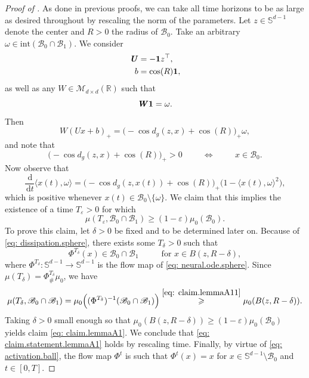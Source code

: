 \documentclass[a4paper,11pt]{article}
\theoremstyle{plain}
\newcommand{\diff}{\, \mathrm{d}}
\renewcommand{\S}{\mathbb{S}^{d-1}}
\newcommand{\bW}{\bm{\mathit{W}}}
\newcommand{\bU}{\bm{\mathit{U}}}
\renewcommand{\geq}{\geqslant}
\numberwithin{equation}{section}
\begin{document}
\begin{proof}[Proof of ]
As done in previous proofs, we can take all time horizons to be as large as desired throughout by rescaling the norm of the parameters.
Let $z\in\S$ denote the center and $R>0$ the radius of $\mathscr{B}_0$. Take an arbitrary $\omega\in\mathrm{int}(\mathscr{B}_0\cap\mathscr{B}_1)$. We consider
\begin{align*}
\bU&=-{\bf1} z^\top,\\
b&=\cos(R){\bf1},
\end{align*}
as well as any $\bW\in \mathscr{M}_{d\times d}(\mathbb{R})$ such that
\begin{equation*}
\bW{\bf1}=\omega.
\end{equation*}
Then
\begin{equation*}
    \bW\left(\bU x+b\right)_+=\Big(-\cos d_g(z,x)+\cos(R)\Big)_+\omega,
\end{equation*}
and note that
\begin{equation}\label{eq: activation.ball}
    \Big(-\cos d_g(z,x)+\cos(R)\Big)_+> 0\hspace{1cm}\iff \hspace{1cm} x\in\mathscr{B}_0.
\end{equation}
Now observe that
\begin{equation}\label{eq: dissipation.sphere}
    \frac{\diff }{\diff t}\langle x(t),\omega\rangle=\Big(-\cos d_g(z,x(t)) +\cos(R)\Big)_+\Big(1-\langle x(t),\omega\rangle^2\Big),
\end{equation}
which is positive whenever $x(t)\in\mathscr{B}_0\setminus\{\omega\}$. We claim that this implies the existence of a time $T_\varepsilon>0$ for which
\begin{equation} \label{eq: claim.lemmaA1} 
    \mu(T_\varepsilon,\mathscr{B}_0\cap\mathscr{B}_1)\geq(1-\varepsilon)\mu_0(\mathscr{B}_0).
\end{equation}
To prove this claim, let $\delta>0$ be fixed and to be determined later on. 
Because of \eqref{eq: dissipation.sphere}, there exists some $T_\delta>0$ such that
\begin{equation}\label{eq: claim.lemmaA11}
    \Phi^{T_\delta}(x)\in\mathscr{B}_0\cap\mathscr{B}_1\hspace{1cm}\text{ for }x\in B(z,R-\delta),
\end{equation}
where $\Phi^{T_\delta}:\S\to \S$ is the flow map of \eqref{eq: neural.ode.sphere}. Since $\mu(T_\delta)=\Phi^{T_\delta}_\#\mu_0$, we have
\begin{equation} \label{eq: mass.concentration}
    \mu(T_\delta, \mathscr{B}_0\cap\mathscr{B}_1)=\mu_0\Big((\Phi^{T_\delta})^{-1}(\mathscr{B}_0\cap\mathscr{B}_1)\Big)\overset{\eqref{eq: claim.lemmaA11}}{\geq}\mu_0(B(z,R-\delta)).
\end{equation}
Taking $\delta>0$ small enough so that $\mu_0(B(z,R-\delta))\geq (1-\varepsilon) \mu_0(\mathscr{B}_0)$ yields claim \eqref{eq: claim.lemmaA1}. We conclude that \eqref{eq: claim.statement.lemmaA1} holds by rescaling time. Finally, by virtue of \eqref{eq: activation.ball}, the flow map $\Phi^t$ is such that $\Phi^t(x)=x$ for
$x\in\S\setminus\mathscr{B}_0$ and $t\in[0,T]$.



\end{proof}
\end{document}
